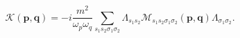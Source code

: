 \begin{equation}
\mathcal{K}(\mathbf{p},\mathbf{q})=-i\frac{m^{2}}{\omega _{p}\omega _{q}}%
\sum_{s_{1}s_{2}\sigma _{1}\sigma _{2}}\Lambda _{s_{1}s_{2}}\mathcal{M}%
_{s_{1}s_{2}\sigma _{1}\sigma _{2}}\left( \mathbf{p,q}\right) \Lambda
_{\sigma _{1}\sigma _{2}}.
\end{equation}

